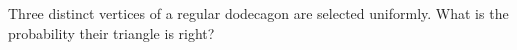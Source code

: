Three distinct vertices of a regular dodecagon are selected uniformly. What is the probability their triangle is right?
